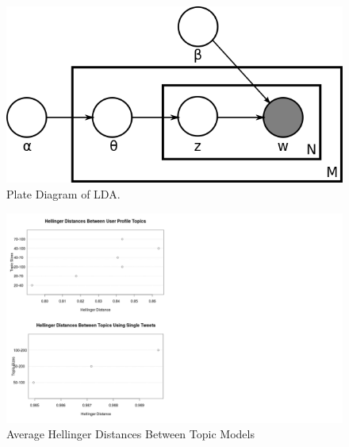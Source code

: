 \documentclass{acm_proc_article-sp}
\begin{document}
\begin{figure}[ht]
\includegraphics[scale=0.4]{figs/LDA}
\caption{Plate Diagram of LDA.}
\label{fig:platelda}
\end{figure}
\begin{figure}[ht]
\includegraphics[scale=0.34]{figs/Rplot2}
\caption{Average Hellinger Distances Between Topic Models}
\label{fig:avghell}
\end{figure}
\end{document}
